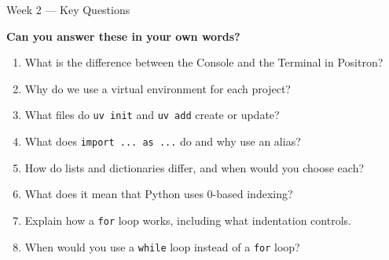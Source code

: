 \documentclass[9pt,aspectratio=169]{beamer}
\begin{document}
\begin{frame}{Week 2 --- Key Questions}

\textbf{Can you answer these in your own words?}

\begin{enumerate}
    \item What is the difference between the Console and the Terminal in Positron?
    \item Why do we use a virtual environment for each project?
    \item What files do \texttt{uv init} and \texttt{uv add} create or update?
    \item What does \texttt{import ... as ...} do and why use an alias?
    \item How do lists and dictionaries differ, and when would you choose each?
    \item What does it mean that Python uses 0-based indexing?
    \item Explain how a \texttt{for} loop works, including what indentation controls.
    \item When would you use a \texttt{while} loop instead of a \texttt{for} loop?
\end{enumerate}

\end{frame}
\end{document}
